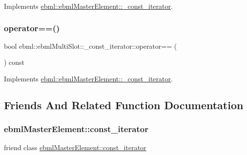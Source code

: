 Implements \mbox{\hyperlink{classebml_1_1ebmlMasterElement_1_1__const__iterator_a102cf8b36c0d8184680ef15594bb59fb}{ebml\+::ebml\+Master\+Element\+::\+\_\+const\+\_\+iterator}}.

\mbox{\label{classebml_1_1ebmlMultiSlot_1_1__const__iterator_a874e71d4f6d86e1213c8381ec20f3069}} 
\subsubsection{\texorpdfstring{operator==()}{operator==()}}
{\footnotesize\ttfamily bool ebml\+::ebml\+Multi\+Slot\+::\+\_\+const\+\_\+iterator\+::operator== (\begin{DoxyParamCaption}\item[{const \mbox{\hyperlink{classebml_1_1ebmlMasterElement_1_1__const__iterator}{ebml\+Master\+Element\+::\+\_\+const\+\_\+iterator}} \&}]{ }\end{DoxyParamCaption}) const\hspace{0.3cm}{\ttfamily [virtual]}}



Implements \mbox{\hyperlink{classebml_1_1ebmlMasterElement_1_1__const__iterator_a936395ed4c0c189a92927bfdf1e28586}{ebml\+::ebml\+Master\+Element\+::\+\_\+const\+\_\+iterator}}.



\subsection{Friends And Related Function Documentation}
\mbox{\label{classebml_1_1ebmlMultiSlot_1_1__const__iterator_a734affd0f736e2e4e03ab2cf8a9f9b26}} 
\subsubsection{\texorpdfstring{ebml\+Master\+Element\+::const\+\_\+iterator}{ebmlMasterElement::const\_iterator}}
{\footnotesize\ttfamily friend class \mbox{\hyperlink{classebml_1_1ebmlMasterElement_1_1const__iterator}{ebml\+Master\+Element\+::const\+\_\+iterator}}\hspace{0.3cm}{\ttfamily [friend]}}

